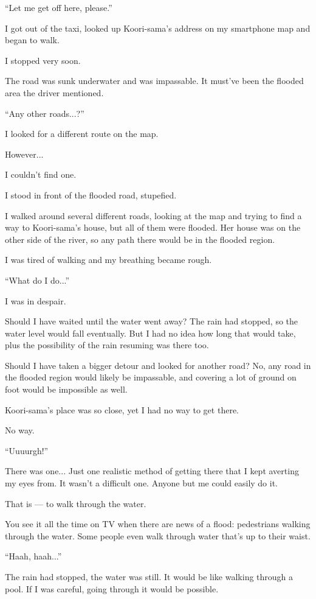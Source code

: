 ``Let me get off here, please.''

I got out of the taxi, looked up Koori-sama's address on my smartphone map and began to walk.

I stopped very soon.

The road was sunk underwater and was impassable. It must've been the flooded area the driver mentioned.

``Any other roads...?''

I looked for a different route on the map.

However...

I couldn't find one.

I stood in front of the flooded road, stupefied.

I walked around several different roads, looking at the map and trying to find a way to Koori-sama's house, but all of them were flooded. Her house was on the other side of the river, so any path there would be in the flooded region.

I was tired of walking and my breathing became rough.

``What do I do...''

I was in despair.

Should I have waited until the water went away? The rain had stopped, so the water level would fall eventually. But I had no idea how long that would take, plus the possibility of the rain resuming was there too.

Should I have taken a bigger detour and looked for another road? No, any road in the flooded region would likely be impassable, and covering a lot of ground on foot would be impossible as well.

Koori-sama's place was so close, yet I had no way to get there.

No way.

``Uuuurgh!''

There was one... Just one realistic method of getting there that I kept averting my eyes from. It wasn't a difficult one. Anyone but me could easily do it.

That is --- to walk through the water.

You see it all the time on TV when there are news of a flood: pedestrians walking through the water. Some people even walk through water that's up to their waist.

``Haah, haah...''

The rain had stopped, the water was  still. It would be like walking through a pool. If I was careful, going through it would be possible.


